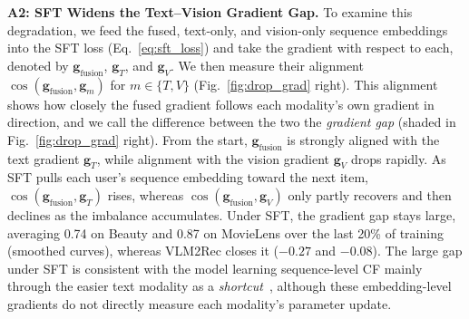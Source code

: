 \vspace{+0.1cm}
\noindent\textbf{A2: SFT Widens the Text--Vision Gradient Gap.}
To examine this degradation, we feed the fused, text-only, and vision-only sequence embeddings into the SFT loss (Eq.~\ref{eq:sft_loss}) and take the gradient with respect to each, denoted by $\mathbf{g}_{\text{fusion}}$, $\mathbf{g}_T$, and $\mathbf{g}_V$. We then measure their alignment $\cos(\mathbf{g}_{\text{fusion}},\mathbf{g}_m)$ for $m\in\{T,V\}$ (Fig.~\ref{fig:drop_grad} right).
This alignment shows how closely the fused gradient follows each modality's own gradient in direction, and we call the difference between the two the \textit{gradient gap} (shaded in Fig.~\ref{fig:drop_grad} right).
From the start, $\mathbf{g}_{\text{fusion}}$ is strongly aligned with the text gradient $\mathbf{g}_T$, while alignment with the vision gradient $\mathbf{g}_V$ drops rapidly.
As SFT pulls each user's sequence embedding toward the next item, $\cos(\mathbf{g}_{\text{fusion}},\mathbf{g}_T)$ rises, whereas $\cos(\mathbf{g}_{\text{fusion}},\mathbf{g}_V)$ only partly recovers and then declines as the imbalance accumulates.
Under SFT, the gradient gap stays large, averaging 0.74 on Beauty and 0.87 on MovieLens over the last 20\% of training (smoothed curves), whereas VLM2Rec closes it ($-0.27$ and $-0.08$).
The large gap under SFT is consistent with the model learning sequence-level CF mainly through the easier text modality as a \textit{shortcut}~\cite{shortcut2}, although these embedding-level gradients do not directly measure each modality's parameter update.




